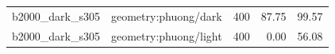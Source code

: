 \begin{longtable}{l>{\raggedright\arraybackslash}p{.42\linewidth}rrr}
b2000\_\allowbreak{}dark\_\allowbreak{}s305 & %
geometry:phuong/dark & %
400 & %
87.75 & %
99.57 \\ %

b2000\_\allowbreak{}dark\_\allowbreak{}s305 & %
geometry:phuong/light & %
400 & %
0.00 & %
56.08 \\ %


\end{longtable}
